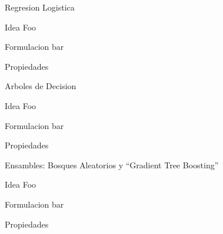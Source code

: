 \documentclass[xcolor=x11names]{beamer}
\begin{document}

\begin{frame}{Regresion Logistica}
			\begin{block}{Idea}
				Foo
			\end{block}

			\begin{block}{Formulacion}
				bar
			\end{block}

			\begin{block}{Propiedades}
				
			\end{block}

\end{frame}



\begin{frame}{Arboles de Decision}
			\begin{block}{Idea}
				Foo
			\end{block}

			\begin{block}{Formulacion}
				bar
			\end{block}

			\begin{block}{Propiedades}
				
			\end{block}

\end{frame}


\begin{frame}{Ensambles: Bosques Aleatorios y ``Gradient Tree Boosting'' }
			\begin{block}{Idea}
				Foo
			\end{block}

			\begin{block}{Formulacion}
				bar
			\end{block}

			\begin{block}{Propiedades}
				
			\end{block}

\end{frame}
\end{document}
